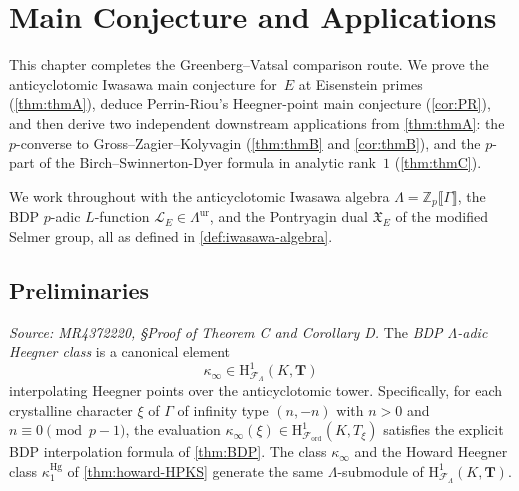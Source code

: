 \providecommand{\rH}{\mathrm{H}}
\providecommand{\Fcal}{\mathcal{F}}
\providecommand{\bQ}{\mathbb{Q}}
\providecommand{\bZ}{\mathbb{Z}}
\providecommand{\sha}{\operatorname{Sha}}
\providecommand{\Lcal}{\mathcal{L}}

\chapter{Main Conjecture and Applications}
\label{chap:main-applications}


This chapter completes the Greenberg--Vatsal comparison route. We prove
the anticyclotomic Iwasawa main conjecture for~$E$ at Eisenstein primes
(\cref{thm:thmA}), deduce Perrin-Riou's Heegner-point main conjecture
(\cref{cor:PR}), and then derive two independent downstream applications
from \cref{thm:thmA}: the $p$-converse to Gross--Zagier--Kolyvagin
(\cref{thm:thmB} and \cref{cor:thmB}), and the $p$-part of the
Birch--Swinnerton-Dyer formula in analytic rank~$1$ (\cref{thm:thmC}).

We work throughout with the anticyclotomic Iwasawa algebra
$\Lambda = \mathbb{Z}_p\llbracket\Gamma\rrbracket$,
the BDP $p$-adic $L$-function $\mathcal{L}_E \in \Lambda^{\mathrm{ur}}$,
and the Pontryagin dual $\mathfrak{X}_E$ of the modified Selmer group,
all as defined in \cref{def:iwasawa-algebra}.

\section{Preliminaries}

\begin{definition}
  \label{def:bdp-class}
  \textit{Source: MR4372220, §Proof of Theorem C and Corollary D.}
  The \emph{BDP \(\Lambda\)-adic Heegner class} is a canonical element
  \[
    \kappa_\infty \in \rH^1_{\mathcal{F}_\Lambda}(K, \mathbf{T})
  \]
  interpolating Heegner points over the anticyclotomic tower. Specifically, for each crystalline character \(\xi\) of \(\Gamma\) of infinity type \((n,-n)\) with \(n > 0\) and \(n \equiv 0 \pmod{p-1}\), the evaluation \(\kappa_\infty(\xi) \in \rH^1_{\mathcal{F}_{\mathrm{ord}}}(K, T_\xi)\) satisfies the explicit BDP interpolation formula of \cref{thm:BDP}. The class \(\kappa_\infty\) and the Howard Heegner class \(\kappa_1^{\mathrm{Hg}}\) of \cref{thm:howard-HPKS} generate the same \(\Lambda\)-submodule of \(\rH^1_{\mathcal{F}_\Lambda}(K, \mathbf{T})\).
\end{definition}

